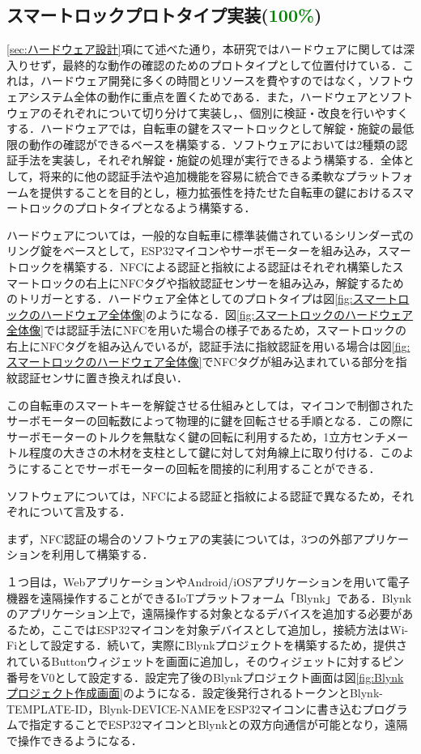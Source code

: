   \subsection{スマートロックプロトタイプ実装(\textcolor{green}{100\%})}
    \label{sec:スマートロックプロトタイプ実装}
      \par \ref{sec:ハードウェア設計}項にて述べた通り，本研究ではハードウェアに関しては深入りせず，最終的な動作の確認のためのプロトタイプとして位置付けている．これは，ハードウェア開発に多くの時間とリソースを費やすのではなく，ソフトウェアシステム全体の動作に重点を置くためである．また，ハードウェアとソフトウェアのそれぞれについて切り分けて実装し，、個別に検証・改良を行いやすくする．ハードウェアでは，自転車の鍵をスマートロックとして解錠・施錠の最低限の動作の確認ができるベースを構築する．ソフトウェアにおいては2種類の認証手法を実装し，それぞれ解錠・施錠の処理が実行できるよう構築する．全体として，将来的に他の認証手法や追加機能を容易に統合できる柔軟なプラットフォームを提供することを目的とし，極力拡張性を持たせた自転車の鍵におけるスマートロックのプロトタイプとなるよう構築する．
      \par ハードウェアについては，一般的な自転車に標準装備されているシリンダー式のリング錠をベースとして，ESP32マイコンやサーボモーターを組み込み，スマートロックを構築する．NFCによる認証と指紋による認証はそれぞれ構築したスマートロックの右上にNFCタグや指紋認証センサーを組み込み，解錠するためのトリガーとする．ハードウェア全体としてのプロトタイプは図\ref{fig:スマートロックのハードウェア全体像}のようになる．図\ref{fig:スマートロックのハードウェア全体像}では認証手法にNFCを用いた場合の様子であるため，スマートロックの右上にNFCタグを組み込んでいるが，認証手法に指紋認証を用いる場合は図\ref{fig:スマートロックのハードウェア全体像}でNFCタグが組み込まれている部分を指紋認証センサに置き換えれば良い．
      \par この自転車のスマートキーを解錠させる仕組みとしては，マイコンで制御されたサーボモーターの回転数によって物理的に鍵を回転させる手順となる．この際にサーボモーターのトルクを無駄なく鍵の回転に利用するため，1立方センチメートル程度の大きさの木材を支柱として鍵に対して対角線上に取り付ける．このようにすることでサーボモーターの回転を間接的に利用することができる．
      \par ソフトウェアについては，NFCによる認証と指紋による認証で異なるため，それぞれについて言及する．
      \par まず，NFC認証の場合のソフトウェアの実装については，3つの外部アプリケーションを利用して構築する．
      \par １つ目は，WebアプリケーションやAndroid/iOSアプリケーションを用いて電子機器を遠隔操作することができるIoTプラットフォーム「Blynk」である．Blynkのアプリケーション上で，遠隔操作する対象となるデバイスを追加する必要があるため，ここではESP32マイコンを対象デバイスとして追加し，接続方法はWi-Fiとして設定する．続いて，実際にBlynkプロジェクトを構築するため，提供されているButtonウィジェットを画面に追加し，そのウィジェットに対するピン番号をV0として設定する．設定完了後のBlynkプロジェクト画面は図\ref{fig:Blynkプロジェクト作成画面}のようになる．設定後発行されるトークンとBlynk-TEMPLATE-ID，Blynk-DEVICE-NAMEをESP32マイコンに書き込むプログラムで指定することでESP32マイコンとBlynkとの双方向通信が可能となり，遠隔で操作できるようになる．
